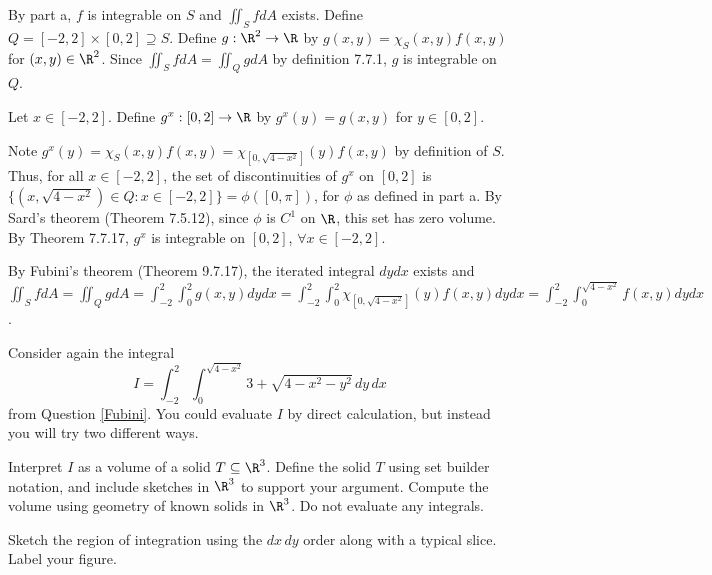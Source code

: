 \documentclass{exam}
\begin{document}
\begin{questions}
\begin{parts}
\begin{answer}{570pt}
By part a, $f$ is integrable on $S$ and $\iint_{S} f dA$ exists. Define $Q = [-2, 2] \times [0, 2] \supseteq S$. Define $g: \R^2 \to \R$ by $g(x, y) = \chi_S(x, y) f(x, y)$ for $(x, y) \in \R^2$. Since $\iint_{S} f dA = \iint_{Q} g dA$ by definition 7.7.1, $g$ is integrable on $Q$. \newline\

Let $x \in [-2, 2]$. Define $g^x : [0, 2] \to \R$ by $g^x (y) = g(x, y)$ for $y \in [0, 2]$.\newline\

Note $g^x(y) = \chi_S(x, y) f(x, y) = \chi_{[0, \sqrt{4-x^2}]}(y) f(x, y)$ by definition of $S$. Thus, for all $x \in [-2, 2]$, the set of discontinuities of $g^x$ on $[0, 2]$ is $\{(x, \sqrt{4 - x^2}) \in Q : x \in [-2, 2]\} = \phi([0, \pi])$, for $\phi$ as defined in part a. By Sard's theorem (Theorem 7.5.12), since $\phi$ is $C^1$ on $\R$, this set has zero volume. By Theorem 7.7.17, $g^x$ is integrable on $[0, 2]$, $\forall x \in [-2, 2]$.\newline\

By Fubini's theorem (Theorem 9.7.17), the iterated integral $dydx$ exists and $\iint_S f dA = \iint_{Q} g dA = \int_{-2}^2 \int_{0}^2 g(x,y) dydx = \int_{-2}^2 \int_0^{2} \chi_{[0, \sqrt{4-x^2}]}(y) f(x,y) dydx = \int_{-2}^2 \int_0^{\sqrt{4-x^2}} f(x,y) dydx$.

\end{answer}

\end{parts}

 
\pagebreak

\question Consider again the integral
\[
I = \int_{-2}^2 \int_0^{\sqrt{4-x^2}} 3+\sqrt{4-x^2-y^2} \, dy \, dx
\]
from Question \ref{Fubini}. You could evaluate $I$ by direct calculation, but instead you will try two different ways. 
\begin{parts}

\item Interpret $I$ as a volume of a solid $T \subseteq \R^3$. Define the solid $T$ using set builder notation, and include sketches in $\R^3$ to support your argument. Compute the volume using geometry of known solids in $\R^3$. Do not evaluate any integrals. 
\begin{answer}{530pt}
\end{answer}
\pagebreak
\item Sketch the region of integration using the $dx \, dy$ order along with a typical slice. Label your figure. 
\begin{answer}{90pt}
\end{answer}


\end{parts}
\end{questions}
\end{document}

